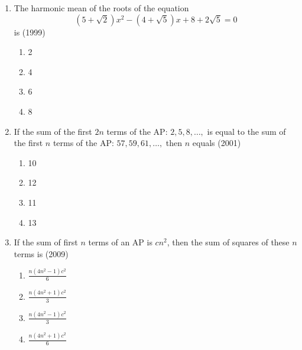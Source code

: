 \begin{enumerate}    [label=\thesubsection.\arabic*, ref=\thesubsection.\theenumi]
    \begin{multicols}{4}
\begin{enumerate}    
        \item 2
        \item 3
        \item 5
        \item 6
        \end{enumerate}
        \end{multicols}
\item The harmonic mean of the roots of the equation
        $$(5+\sqrt{2})x^2-(4+\sqrt{5})x+8+2\sqrt{5}=0$$ is 
        \hfill(1999)
%            
%        
        \begin{multicols}{4}
\begin{enumerate}    
            \item 2
            \item 4
            \item 6
            \item 8
        \end{enumerate}
        \end{multicols}
\item If the sum of the first $2n$ terms of the AP: $2, 5, 8, \dots, $ is equal to the sum of the first $n$ terms of the AP: $ 57, 59, 61, \dots, $ then $n$ equals \hfill(2001)
        \begin{multicols}{4}
\begin{enumerate}    
            \item 10
            \item 12
            \item 11
            \item 13
            \end{enumerate}
            \end{multicols}
\item If the sum of first $n$ terms of an AP is $cn^2$,  then the sum of squares of these $n$ terms is \hfill(2009)
%                
%            
             \begin{multicols}{4}
\begin{enumerate}    
                    \item $\frac{n(4n^2-1)c^2}{6}$
                    \item $\frac{n(4n^2+1)c^2}{3}$
                    \item $\frac{n(4n^2-1)c^2}{3}$
                    \item $\frac{n(4n^2+1)c^2}{6}$
		\end{enumerate}

\end{multicols}
\end{enumerate}
